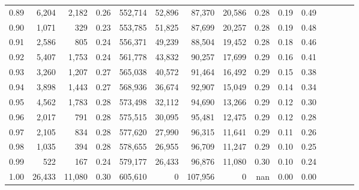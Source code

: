 \begin{tabular}{rrrcrrrrrrrrrrr}
0.89 &   6,204 &   2,182 &                                       0.26 &  552,714 &   52,896 &   87,370 &   20,586 &  0.28 &  0.19 &                         0.49 \\
0.90 &   1,071 &     329 &                                       0.23 &  553,785 &   51,825 &   87,699 &   20,257 &  0.28 &  0.19 &                         0.48 \\
0.91 &   2,586 &     805 &                                       0.24 &  556,371 &   49,239 &   88,504 &   19,452 &  0.28 &  0.18 &                         0.46 \\
0.92 &   5,407 &   1,753 &                                       0.24 &  561,778 &   43,832 &   90,257 &   17,699 &  0.29 &  0.16 &                         0.41 \\
0.93 &   3,260 &   1,207 &                                       0.27 &  565,038 &   40,572 &   91,464 &   16,492 &  0.29 &  0.15 &                         0.38 \\
0.94 &   3,898 &   1,443 &                                       0.27 &  568,936 &   36,674 &   92,907 &   15,049 &  0.29 &  0.14 &                         0.34 \\
0.95 &   4,562 &   1,783 &                                       0.28 &  573,498 &   32,112 &   94,690 &   13,266 &  0.29 &  0.12 &                         0.30 \\
0.96 &   2,017 &     791 &                                       0.28 &  575,515 &   30,095 &   95,481 &   12,475 &  0.29 &  0.12 &                         0.28 \\
0.97 &   2,105 &     834 &                                       0.28 &  577,620 &   27,990 &   96,315 &   11,641 &  0.29 &  0.11 &                         0.26 \\
0.98 &   1,035 &     394 &                                       0.28 &  578,655 &   26,955 &   96,709 &   11,247 &  0.29 &  0.10 &                         0.25 \\
0.99 &     522 &     167 &                                       0.24 &  579,177 &   26,433 &   96,876 &   11,080 &  0.30 &  0.10 &                         0.24 \\
1.00 &  26,433 &  11,080 &                                       0.30 &  605,610 &        0 &  107,956 &        0 &   nan &  0.00 &                         0.00 \\
\bottomrule
\end{tabular}
